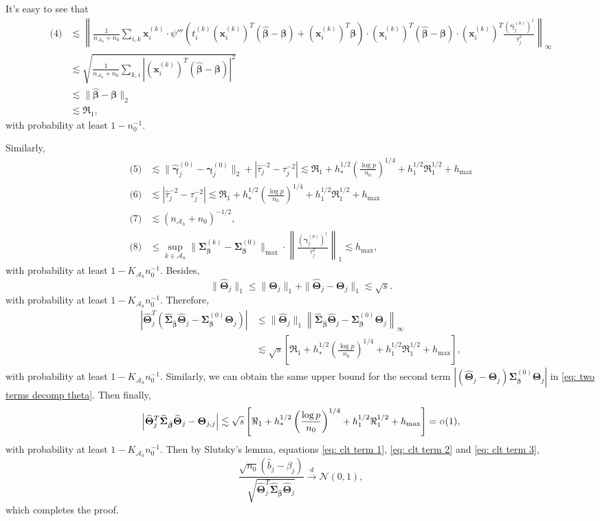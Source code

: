 \documentclass[12pt]{article}
\newcommand{\hb}{\hat{b}}
\newcommand{\infnorma}[1]{\left\|#1\right\|_{\infty}}
\newcommand{\onenorma}[1]{\left\|#1\right\|_{1}}
\newcommand{\twonorm}[1]{\|#1\|_{2}}
\newcommand{\onenorm}[1]{\|#1\|_{1}}
\newcommand{\maxnorm}[1]{\|#1\|_{\max}}
\newcommand{\norma}[1]{\left|#1\right|}
\newcommand{\norm}[1]{|#1|}
\newcommand{\bbeta}{\bm{\beta}}
\newcommand{\hbeta}{\hat{\bm{\beta}}}
\newcommand{\htau}{\hat{\tau}}
\newcommand{\bgammak}[1]{\bm{\gamma}^{(#1)}}
\newcommand{\hbgammak}[1]{\hat{\bm{\gamma}}^{(#1)}}
\newcommand{\bxk}[1]{\bm{x}^{(#1)}}
\newcommand{\mah}{\mathcal{A}_h}
\newcommand{\nah}{n_{\mathcal{A}_h}}
\newcommand{\Kah}{K_{\mah}}
\newcommand{\<}{\langle}
\renewcommand{\>}{\rangle}
\newcommand{\bTheta}{\bm{\Theta}}
\newcommand{\hTheta}{\widehat{\bm{\Theta}}}
\newcommand{\hSigma}{\widehat{\bm{\Sigma}}}
\newcommand{\bSigmak}[1]{\bm{\Sigma}^{(#1)}}
\newcommand\smallo{
  \mathchoice
    {{\scriptstyle\mathcal{O}}}%
    {{\scriptstyle\mathcal{O}}}%
    {{\scriptscriptstyle\mathcal{O}}}%
    {\scalebox{.7}{$\scriptscriptstyle\mathcal{O}$}}%
}
\begin{document}
It's easy to see that
\begin{align}
	\text{(4)} &\lesssim \infnorma{\frac{1}{\nah+n_0}\sum_{i,k}\bxk{k}_i\cdot \psi'''(t_i^{(k)}(\bxk{k}_i)^T(\hbeta - \bbeta) + (\bxk{k}_i)^T\bbeta)\cdot (\bxk{k}_i)^T(\hbeta - \bbeta)\cdot(\bxk{k}_i)^T\frac{(\hbgammak{0}_j)^{\dagger}}{\htau_j^2}} \\
	&\lesssim \sqrt{\frac{1}{\nah+n_0}\sum_{k, i}\norm{(\bxk{k}_i)^T(\hbeta - \bbeta)}^2} \\
	&\lesssim \twonorm{\hbeta - \bbeta} \\
	&\lesssim \Re_1,
\end{align}
with probability at least $1-n_0^{-1}$.

Similarly,
\begin{align}
	\text{(5)} &\lesssim \twonorm{\hbgammak{0}_j- \bgammak{0}_j} + \norm{\htau_j^{-2} - \tau_j^{-2}} \lesssim \Re_1 + h^{1/2}_*\left(\frac{\log p}{n_0}\right)^{1/4} + h_1^{1/2}\Re_1^{1/2} + h_{\max}\\
	\text{(6)} &\lesssim \norm{\htau_j^{-2} - \tau_j^{-2}} \lesssim \Re_1 + h^{1/2}_*\left(\frac{\log p}{n_0}\right)^{1/4} + h_1^{1/2}\Re_1^{1/2}+ h_{\max}\\
	\text{(7)} &\lesssim (\nah+n_0)^{-1/2},\\
	\text{(8)} &\leq \sup_{k \in \mah}\maxnorm{\bSigmak{k}_{\bbeta}-\bSigmak{0}_{\bbeta}}\cdot \onenorma{\frac{(\bgammak{0}_j)^{\dagger}}{\tau_j^2}} \lesssim h_{\max},
\end{align}
with probability at least $1-\Kah n_0^{-1}$. Besides,
\begin{equation}
	\onenorm{\hTheta_j} \leq \onenorm{\bTheta_j} + \onenorm{\hTheta_j - \bTheta_j} \lesssim \sqrt{s}.
\end{equation}
with probability at least $1-\Kah n_0^{-1}$.
Therefore,
\begin{align}
	\norma{\hTheta_j^T(\hSigma_{\hbeta}\hTheta_j - \bSigmak{0}_{\bbeta}\bTheta_{j})} &\leq \onenorm{\hTheta_j}\infnorma{\hSigma_{\hbeta}\hTheta_j - \bSigmak{0}_{\bbeta}\bTheta_{j}} \\
	&\lesssim \sqrt{s}\left[\Re_1 + h^{1/2}_*\left(\frac{\log p}{n_0}\right)^{1/4} + h_1^{1/2}\Re_1^{1/2} + h_{\max}\right],
\end{align}
with probability at least $1-\Kah n_0^{-1}$. Similarly, we can obtain the same upper bound for the second term $\norma{(\hTheta_j - \bTheta_j)\bSigmak{0}_{\bbeta}\bTheta_{j}}$ in \eqref{eq: two terms decomp theta}. Then finally,
\begin{equation}
	\norma{\hTheta_j^T\hSigma_{\hbeta}\hTheta_j - \bTheta_{j,j}} \lesssim \sqrt{s}\left[\Re_1 + h^{1/2}_*\left(\frac{\log p}{n_0}\right)^{1/4} + h_1^{1/2}\Re_1^{1/2} + h_{\max}\right] = \smallo(1),
\end{equation}
with probability at least $1-\Kah n_0^{-1}$. Then by Slutsky's lemma, equations \eqref{eq: clt term 1}, \eqref{eq: clt term 2} and \eqref{eq: clt term 3},
\begin{equation}
	\frac{\sqrt{n_0}(\hb_j - \beta_j)}{\sqrt{\hTheta_j^T\hSigma_{\hbeta}\hTheta_j}} \xrightarrow{d} \mathcal{N}(0, 1),
\end{equation}
which completes the proof.
\end{document}
